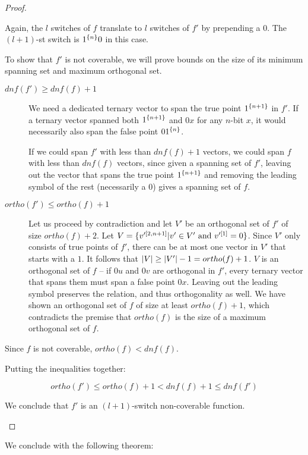 \begin{proof}
\begin{enumerate}
Again,
the $l$ switches of $f$ translate to $l$ switches of $f'$
by prepending a $0$.
The $(l+1)$-st switch is $1^{\{n\}} 0$ in this case.

To show that $f'$ is not coverable,
we will prove bounds on the size of its minimum spanning set and maximum orthogonal set.

\begin{description}
\item[$dnf(f') \geq dnf(f) + 1$]
We need a dedicated ternary vector to span the true point
$1^{\{n+1\}}$ in $f'$.
If a ternary vector spanned
both $1^{\{n+1\}}$
and $0 x$ for any $n$-bit $x$,
it would necessarily also span the false point
$0 1^{\{n\}}$.

If we could span $f'$ with less than $dnf(f) + 1$ vectors,
we could span $f$ with less than $dnf(f)$ vectors,
since given a spanning set of $f'$,
leaving out the vector
that spans the true point $1^{\{n+1\}}$
and removing the leading symbol of the rest
(necessarily a $0$)
gives a spanning set of $f$.

\item[$ortho(f') \leq ortho(f) + 1$]
Let us proceed by contradiction
and let $V'$ be an orthogonal set of $f'$
of size $ortho(f) + 2$.
Let $V = \{v'^{[2, n+1]} | v' \in V'
\text{ and } v'^{[1]} = 0\}$.
Since $V'$ only consists of true points of $f'$,
there can be at most one vector in $V'$
that starts with a $1$.
It follows that
$\lvert V\rvert \geq \lvert V'\rvert - 1 = ortho(f) + 1$.
$V$ is an orthogonal set of $f$ --
if $0 u$ and $0 v$ are orthogonal in $f'$,
every ternary vector that spans them must span
a false point $0 x$.
Leaving out the leading symbol preserves the relation,
and thus orthogonality as well.
We have shown an orthogonal set of $f$ of size at least
$ortho(f) + 1$,
which contradicts the premise that $ortho(f)$ is the size
of a maximum orthogonal set of $f$.
\end{description}

Since $f$ is not coverable,
$ortho(f) < dnf(f)$.

Putting the inequalities together:

$$
ortho(f') \leq ortho(f) + 1 < dnf(f) + 1 \leq dnf(f')
$$

We conclude that $f'$ is an $(l+1)$-switch non-coverable
function.
\end{enumerate}
\end{proof}

We conclude with the following theorem:

